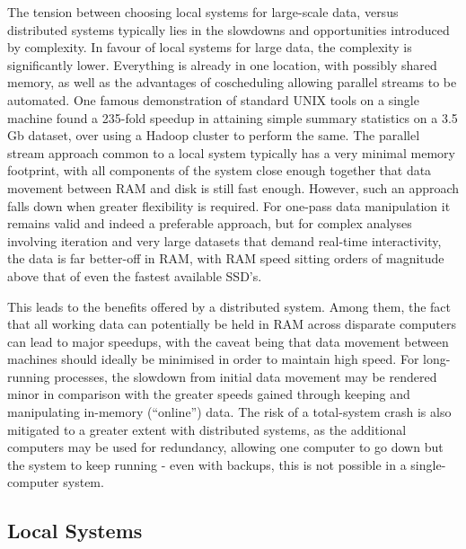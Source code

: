 The tension between choosing local systems for large-scale data, versus distributed systems typically lies in the slowdowns and opportunities introduced by complexity.
In favour of local systems for large data, the complexity is significantly lower.
Everything is already in one location, with possibly shared memory, as well as the advantages of coscheduling allowing parallel streams to be automated.
One famous demonstration of standard UNIX tools on a single machine found a 235-fold speedup in attaining simple summary statistics on a 3.5 Gb dataset, over using a Hadoop cluster to perform the same\cite{drake2014cltvscluster}.
The parallel stream approach common to a local system typically has a very minimal memory footprint, with all components of the system close enough together that data movement between RAM and disk is still fast enough.
However, such an approach falls down when greater flexibility is required.
For one-pass data manipulation it remains valid and indeed a preferable approach, but for complex analyses involving iteration and very large datasets that demand real-time interactivity, the data is far better-off in RAM, with RAM speed sitting orders of magnitude above that of even the fastest available SSD's\cite{kim201923}\cite{samsung2020SSD}.

This leads to the benefits offered by a distributed system.
Among them, the fact that all working data can potentially be held in RAM across disparate computers can lead to major speedups, with the caveat being that data movement between machines should ideally be minimised in order to maintain high speed.
For long-running processes, the slowdown from initial data movement may be rendered minor in comparison with the greater speeds gained through keeping and manipulating in-memory (``online'') data\cite{emmerich2000engineering}.
The risk of a total-system crash is also mitigated to a greater extent with distributed systems, as the additional computers may be used for redundancy, allowing one computer to go down but the system to keep running - even with backups, this is not possible in a single-computer system.

\subsection{Local Systems}

